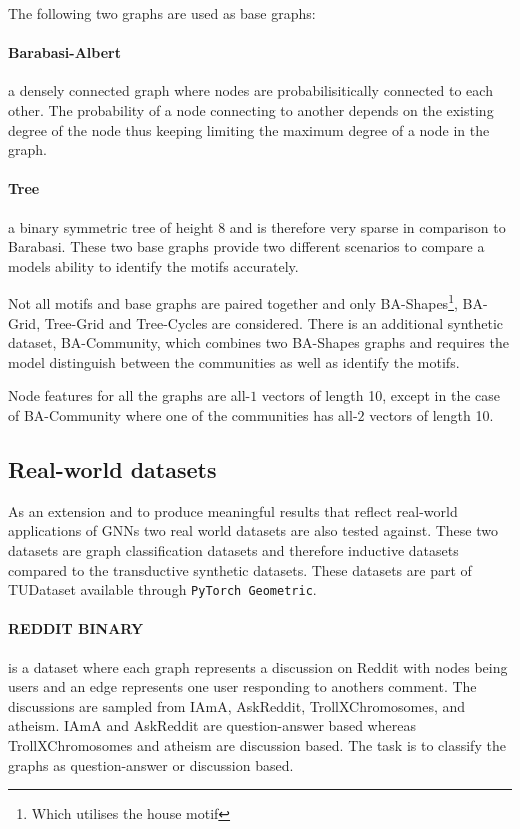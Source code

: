 The following two graphs are used as base graphs:

\paragraph{Barabasi-Albert}
a densely connected graph where nodes are probabilisitically connected to each other.
The probability of a node connecting to another depends on the existing degree of the node thus keeping limiting the maximum degree of a node in the graph.

\paragraph{Tree}
a binary symmetric tree of height 8 and is therefore very sparse in comparison to Barabasi.
These two base graphs provide two different scenarios to compare a models ability to identify the motifs accurately.

Not all motifs and base graphs are paired together and only BA-Shapes\footnote{Which utilises the house motif}, BA-Grid, Tree-Grid and Tree-Cycles are considered.
There is an additional synthetic dataset, BA-Community, which combines two BA-Shapes graphs and requires the model distinguish between the communities as well as identify the motifs.

Node features for all the graphs are all-$1$ vectors of length 10, except in the case of BA-Community where one of the communities has all-$2$ vectors of length 10.

\subsection{Real-world datasets}
\label{sec:RWD}


As an extension and to produce meaningful results that reflect real-world applications of GNNs two real world datasets are also tested against.
These two datasets are graph classification datasets and therefore inductive datasets compared to the transductive synthetic datasets.
These datasets are part of TUDataset \cite{Morris+2020} available through \texttt{PyTorch Geometric}.

\paragraph{REDDIT BINARY}
is a dataset where each graph represents a discussion on Reddit with nodes being users and an edge represents one user responding to anothers comment.
The discussions are sampled from IAmA, AskReddit, TrollXChromosomes, and atheism.
IAmA and AskReddit are question-answer based whereas TrollXChromosomes and atheism are discussion based.
The task is to classify the graphs as question-answer or discussion based.

